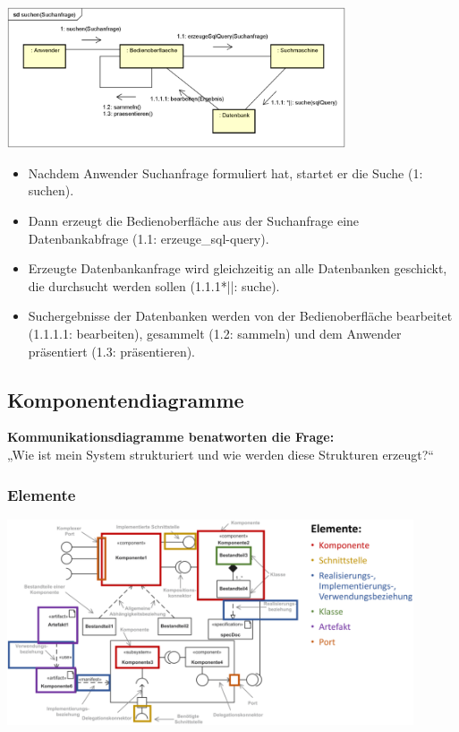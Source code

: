 \documentclass[11pt, a4paper]{article}
\begin{document}
\centering \includegraphics[width=0.75\textwidth]{Kommunikation-01.png}

\tiny
\begin{itemize}
    \item Nachdem Anwender Suchanfrage formuliert hat, startet er die Suche (1: suchen).
    \item Dann erzeugt die Bedienoberfläche aus der Suchanfrage eine Datenbankabfrage (1.1: erzeuge\_sql-query).
    \item Erzeugte Datenbankanfrage wird gleichzeitig an alle Datenbanken geschickt, die durchsucht werden sollen (1.1.1*||: suche).
    \item Suchergebnisse der Datenbanken werden von der Bedienoberfläche bearbeitet (1.1.1.1: bearbeiten), gesammelt (1.2: sammeln) und dem Anwender präsentiert (1.3: präsentieren).
\end{itemize}

\newpage



\raggedright \subsection{Komponentendiagramme}

\vspace{1em}

\small
\textbf{Kommunikationsdiagramme benatworten die Frage:} \\ „Wie ist mein System strukturiert und wie werden diese Strukturen erzeugt?“

\raggedright \subsubsection{Elemente}

\centering \includegraphics[width=0.9\textwidth]{Komponenten-00.png}
\end{document}

